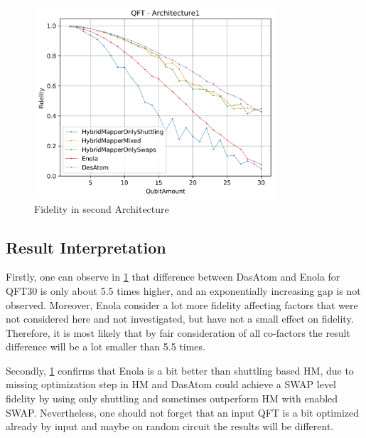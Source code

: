 \begin{figure}[htbp]
  \centering
    \includegraphics[width=0.8\textwidth]{figures/FidelityArch2.png}
    \caption[Fidelity in second Architecture]{Fidelity in second Architecture}
    \label{fig:FidelityArch2}
\end{figure}

\subsection{Result Interpretation}
Firstly, one can observe in \ref{fig:FidelityArch2} that difference between DasAtom and Enola for \ac{QFT}30 is only about 5.5 times higher,
and an exponentially increasing gap is not observed.
Moreover, Enola consider a lot more fidelity affecting factors that were not considered here and not investigated, 
but have not a small effect on fidelity. 
Therefore, it is most likely that by fair consideration of all co-factors the result difference will be a lot smaller than 5.5 times.

Secondly, \ref{fig:FidelityArch2} confirms that Enola is a bit better than shuttling based \ac{HM}, due to missing optimization step in \ac{HM}
and DasAtom could achieve a SWAP level fidelity by using only shuttling and sometimes outperform \ac{HM} with enabled SWAP.
Nevertheless, one should not forget that an input QFT is a bit optimized already by input and maybe on random circuit the results will be different.
